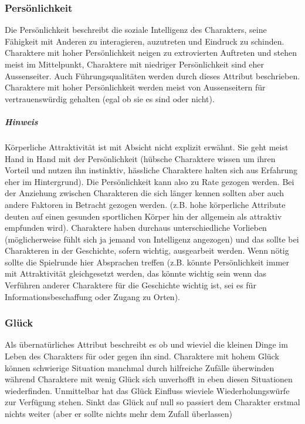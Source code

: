\documentclass{article}
\begin{document}
\subsubsection{Persönlichkeit}

Die Persönlichkeit beschreibt die soziale Intelligenz des Charakters, seine Fähigkeit mit Anderen zu interagieren,
auzutreten und Eindruck zu schinden. Charaktere mit hoher Persönlichkeit neigen zu extrovierten Auftreten und stehen
meist im Mittelpunkt, Charaktere mit niedriger Persönlichkeit sind eher Aussenseiter. Auch Führungsqualitäten werden
durch dieses Attribut beschrieben. Charaktere mit hoher Persönlichkeit werden meist von Aussenseitern für
vertrauenswürdig gehalten (egal ob sie es sind oder nicht).

\subparagraph{Hinweis}

Körperliche Attraktivität ist mit Absicht nicht explizit erwähnt. Sie geht meist Hand in Hand mit der Persönlichkeit
(hübsche Charaktere wissen um ihren Vorteil und nutzen ihn instinktiv, hässliche Charaktere halten sich aus Erfahrung
eher im Hintergrund). Die Persönlichkeit kann also zu Rate gezogen werden. Bei der Anziehung zwischen Charakteren die
sich länger kennen sollten aber auch andere Faktoren in Betracht gezogen werden. (z.B. hohe körperliche Attribute
deuten auf einen gesunden sportlichen Körper hin der allgemein als attraktiv empfunden wird). Charaktere haben
durchaus unterschiedliche Vorlieben (möglicherweise fühlt sich ja jemand von Intelligenz angezogen) und das sollte
bei Charakteren in der Geschichte, sofern wichtig, ausgearbeit werden. Wenn nötig sollte die Spielrunde hier
Absprachen treffen (z.B. könnte Persönlichkeit immer mit Attraktivität gleichgesetzt werden, das könnte wichtig sein
wenn das Verführen anderer Charaktere für die Geschichte wichtig ist, sei es für Informationsbeschaffung oder Zugang
zu Orten).

\subsubsection{Glück}

Als übernatürliches Attribut beschreibt es ob und wieviel die kleinen Dinge im Leben des Charakters für oder gegen ihn
sind. Charaktere mit hohem Glück können schwierige Situation manchmal durch hilfreiche Zufälle überwinden während
Charaktere mit wenig Glück sich unverhofft in eben diesen Situationen wiederfinden. Unmittelbar hat das Glück Einfluss
wieviele Wiederholungswürfe zur Verfügung stehen. Sinkt das Glück auf null so passiert dem Charakter erstmal nichts
weiter (aber er sollte nichts mehr dem Zufall überlassen)
\end{document}
